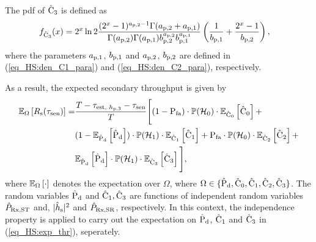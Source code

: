 \begin{lemma} \label{lm_HS:lem6}
\normalfont
The pdf of $\ecth$ is defined as 
\begin{align}
\dcth(x) &= 2^x \ln 2 \frac{(2^x - 1)^{\apt - 1} \Gamma(\apt + \apo)}{\Gamma(\apt) \Gamma(\apo) \bpt^{\apt} \bpo^{\apo}} \left(\frac{1}{\bpo} + \frac{2^x - 1}{\bpt}\right), \label{eq_HS:den_C3}
\end{align}
where the parameters $\apo$, $\bpo$ and $\apt$, $\bpt$ are defined in (\ref{eq_HS:den_C1_para}) and (\ref{eq_HS:den_C2_para}), respectively.
\end{lemma}
As a result, the expected secondary throughput is given by 
\begin{align}
\e{\Omega}{\rs(\tsen)} =& \frac{T - \testpr - \tsen}{T}  
\Bigg[ (1 - \pfa) \cdot \phz \cdot \e{\ecz}{\ecz} +  \nonumber \\ & (1 - \e{\epd}\epd) \cdot \pho \cdot \e{\eco}{\eco} +  \pfa \cdot \phz \cdot \e{\ectw}{\ectw} + \nonumber  \\ & \e{\epd}{\epd} \cdot \pho \cdot \e{\ecth}{\ecth} \Bigg], \label{eq_HS:exp_thr} 
\end{align}
where $\e{\Omega}{\cdot}$ denotes the expectation over $\Omega$, where $\Omega \in \{ \epd, \ecz, \eco, \ectw, \ecth \}$. The random variables $\epd$ and  $\eco, \ecth$ are functions of independent random variables $\eprcvd$ and, $\ephs$ and $\eprcvdsr$, respectively. In this context, the independence property is applied to carry out the expectation on $\epd$, $\eco$ and $\ecth$ in (\ref{eq_HS:exp_thr}), seperately.


